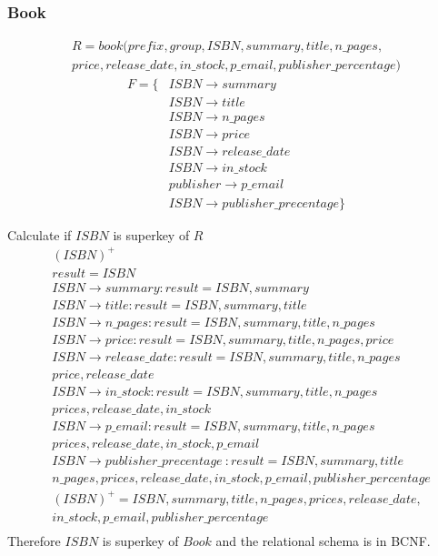 \documentclass[fleqn]{scrreprt}
\begin{document}
\newpage
\subsubsection{Book}
\begin{multline*}
    R = book(prefix, group, ISBN, summary, title, n\_pages,\\
    price, release\_date, in\_stock, p\_email, publisher\_percentage)
\end{multline*}
\begin{align*}
    F = \{ & ISBN \rightarrow summary\\
          & ISBN \rightarrow title\\
          & ISBN \rightarrow n\_pages\\
          & ISBN \rightarrow price\\
          & ISBN \rightarrow release\_date\\
          & ISBN \rightarrow in\_stock\\
          & publisher \rightarrow p\_email\\
          & ISBN \rightarrow publisher\_precentage\}
\end{align*}

Calculate if $ISBN$ is superkey of $R$
\begin{align*}
    & (ISBN)^+\\
    & result = ISBN\\
    & ISBN \rightarrow summary : result = ISBN, summary\\
    & ISBN \rightarrow title : result = ISBN, summary, title\\
    & ISBN \rightarrow n\_pages : result = ISBN, summary, title, n\_pages\\
    & ISBN \rightarrow price : result = ISBN, summary, title, n\_pages, price\\
    & ISBN \rightarrow release\_date : result = ISBN, summary, title, n\_pages\\
    & price, release\_date\\
    & ISBN \rightarrow in\_stock : result = ISBN, summary, title, n\_pages\\
    & prices, release\_date, in\_stock\\
    & ISBN \rightarrow p\_email : result = ISBN, summary, title, n\_pages\\
    & prices, release\_date, in\_stock, p\_email\\
    & ISBN \rightarrow publisher\_precentage\ : result = ISBN, summary, title\\
    & n\_pages, prices, release\_date, in\_stock, p\_email, publisher\_percentage\\
    & (ISBN)^+ = ISBN, summary, title, n\_pages, prices, release\_date,\\
    & in\_stock, p\_email, publisher\_percentage\\
\end{align*}
Therefore $ISBN$ is superkey of $Book$ and the relational schema is in BCNF.
\end{document}

